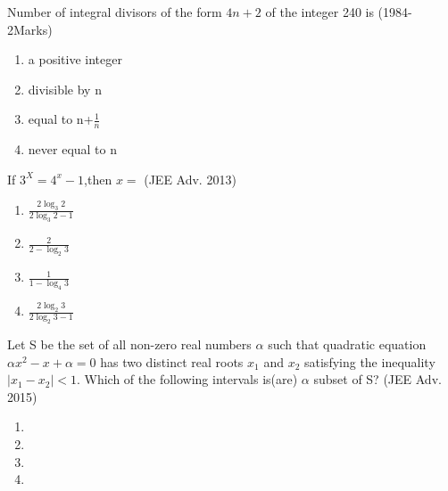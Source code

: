 \iffalse
  \title{Assignment}
  \author{Pappuri Prahladha}
  \section{mcq-multiple}
\fi


    \item Number of integral divisors of the form $4n+2$ of the integer 240 is        \hfill (1984-2Marks)
 \begin{multicols}{2}
 \begin{enumerate}
     \item a positive integer
     \item divisible by n
     \item equal to n+$\frac{1}{n}$
     \item never equal to n
 \end{enumerate}
 \end{multicols}
 \item If $3^X=4^x-1$,then $x=$ \hfill (JEE Adv. 2013)
 \begin{multicols}{2}
 \begin{enumerate}
     \item $\frac{2\log_3 2}{2\log_3 2-1}$
     \item $\frac{2}{2-\log_2 3}$
     \item $\frac{1}{1-\log_4 3}$
     \item $\frac{2\log_2 3}{2\log_2 3-1}$
 \end{enumerate}
 \end{multicols}
 \item Let S be the set of all non-zero real numbers \(\alpha\) such that quadratic equation $\alpha x^2-x+\alpha=0$ has two distinct real roots $x_1$ and $x_2$ satisfying the inequality$|x_1-x_2|<1$. Which of the following intervals is(are) $\alpha$ subset of S? \hfill (JEE Adv. 2015)
 \begin{multicols}{2}
 \begin{enumerate}
     \item {}
     \item {}
     \item {}
    \item {}
 \end{enumerate}
 \end{multicols}


% 

